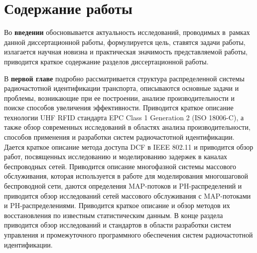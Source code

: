 \section*{Содержание работы}
Во \textbf{введении} обосновывается актуальность исследований, проводимых в~рамках данной диссертационной работы, формулируется цель, ставятся задачи работы, излагается научная новизна и практическая значимость представляемой работы, приводится краткое содержание разделов диссертационной работы.


В \textbf{первой главе} подробно рассматривается структура распределенной системы радиочастотной идентификации транспорта, описываются основные задачи и проблемы, возникающие при ее построении, анализе производительности и поиске способов увеличения эффективности. Приводится краткое описание технологии UHF RFID стандарта EPC Class 1 Generation 2 (ISO 18006-C), а также обзор современных исследований в областях анализа производительности, способов применения и разработки систем радиочастотной идентификации. Дается краткое описание метода доступа DCF в IEEE 802.11 и приводится обзор работ, посвященных исследованию и моделированию задержек в каналах беспроводных сетей. Приводится описание многофазной системы массового обслуживания, которая используется в работе для моделирования многошаговой беспроводной сети, даются определения MAP-потоков и PH-распределений и приводится обзор исследований сетей массового обслуживания с MAP-потоками и PH-распределениями. Приводится краткое описание и обзор методов их восстановления по известным статистическим данным. В конце раздела приводится обзор исследований и стандартов в области разработки систем управления и промежуточного программного обеспечения систем радиочастотной идентификации.




